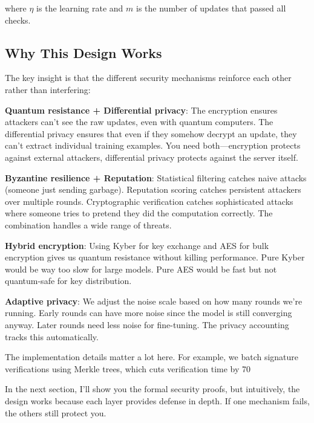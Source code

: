 \documentclass[onecolumn,11pt]{article}
\begin{document}
where $\eta$ is the learning rate and $m$ is the number of updates that passed all checks.

\subsection{Why This Design Works}

The key insight is that the different security mechanisms reinforce each other rather than interfering:

\textbf{Quantum resistance + Differential privacy}: The encryption ensures attackers can't see the raw updates, even with quantum computers. The differential privacy ensures that even if they somehow decrypt an update, they can't extract individual training examples. You need both—encryption protects against external attackers, differential privacy protects against the server itself.

\textbf{Byzantine resilience + Reputation}: Statistical filtering catches naive attacks (someone just sending garbage). Reputation scoring catches persistent attackers over multiple rounds. Cryptographic verification catches sophisticated attacks where someone tries to pretend they did the computation correctly. The combination handles a wide range of threats.

\textbf{Hybrid encryption}: Using Kyber for key exchange and AES for bulk encryption gives us quantum resistance without killing performance. Pure Kyber would be way too slow for large models. Pure AES would be fast but not quantum-safe for key distribution.

\textbf{Adaptive privacy}: We adjust the noise scale based on how many rounds we're running. Early rounds can have more noise since the model is still converging anyway. Later rounds need less noise for fine-tuning. The privacy accounting tracks this automatically.

The implementation details matter a lot here. For example, we batch signature verifications using Merkle trees, which cuts verification time by 70%

In the next section, I'll show you the formal security proofs, but intuitively, the design works because each layer provides defense in depth. If one mechanism fails, the others still protect you.
\end{document}
